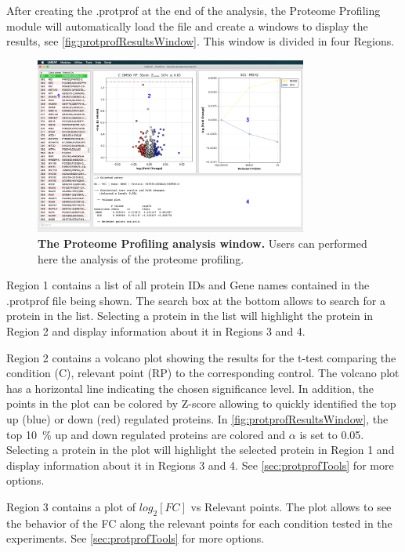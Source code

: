 After creating the .protprof at the end of the analysis, the Proteome Profiling module will automatically load the file and create a windows to display the results, see \autoref{fig:protprofResultsWindow}. This window is divided in four Regions. 

\begin{figure}[h]
	\centering
	\includegraphics[width=0.8\textwidth]{./IMAGES/MOD-PROTPROF/protprof-frag.jpg}	    
	\caption[The Proteome Profiling analysis window]{\textbf{The Proteome Profiling analysis window.} Users can performed here the analysis of the proteome profiling.} 
	\label{fig:protprofResultsWindow}
	\vspace{-5pt} 	
\end{figure}

Region \num{1} contains a list of all protein IDs and Gene names contained in the .protprof file being shown. The search box at the bottom allows to search for a protein in the list. Selecting a protein in the list will highlight the protein in Region \num{2} and display information about it in Regions \num{3} and \num{4}.

Region \num{2} contains a volcano plot showing the results for the t-test comparing the condition (C), relevant point (RP) to the corresponding control. The volcano plot has a horizontal line indicating the chosen significance level. In addition, the points in the plot can be colored by Z-score allowing to quickly identified the top up (blue) or down (red) regulated proteins. In \autoref{fig:protprofResultsWindow}, the top \SI{10}{\percent} up and down regulated proteins are colored and $\alpha$ is set to 0.05. Selecting a protein in the plot will highlight the selected protein in Region \num{1} and display information about it in Regions \num{3} and \num{4}. See \autoref{sec:protprofTools} for more options.

Region \num{3} contains a plot of $log_2[FC]$ vs Relevant points. The plot allows to see the behavior of the FC along the relevant points for each condition tested in the experiments. See \autoref{sec:protprofTools} for more options.


